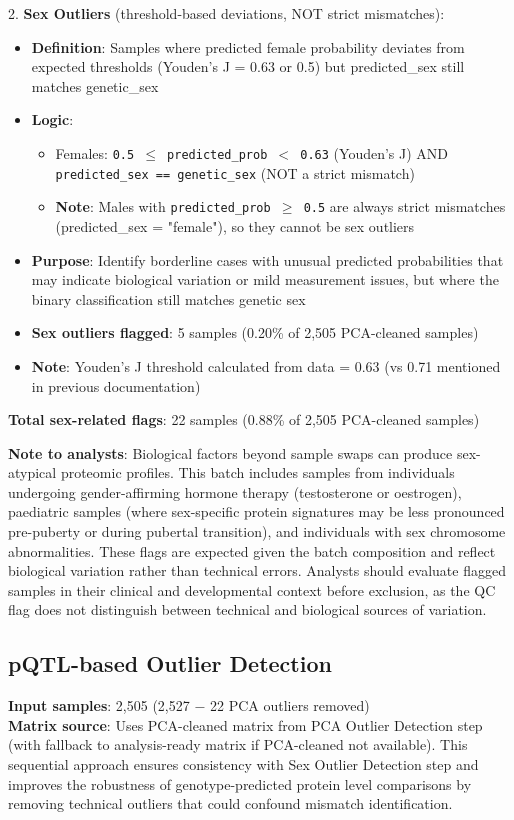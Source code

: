 \documentclass[11pt,a4paper]{article}
\begin{document}
2. \textbf{Sex Outliers} (threshold-based deviations, NOT strict mismatches):
   \begin{itemize}
     \item \textbf{Definition}: Samples where predicted female probability deviates from expected thresholds (Youden's J = 0.63 or 0.5) but predicted\_sex still matches genetic\_sex
     \item \textbf{Logic}:
       \begin{itemize}
         \item Females: \texttt{0.5 $\leq$ predicted\_prob $<$ 0.63} (Youden's J) AND \texttt{predicted\_sex == genetic\_sex} (NOT a strict mismatch)
         \item \textbf{Note}: Males with \texttt{predicted\_prob $\geq$ 0.5} are always strict mismatches (predicted\_sex = "female"), so they cannot be sex outliers
       \end{itemize}
     \item \textbf{Purpose}: Identify borderline cases with unusual predicted probabilities that may indicate biological variation or mild measurement issues, but where the binary classification still matches genetic sex
     \item \textbf{Sex outliers flagged}: 5 samples (0.20\% of 2,505 PCA-cleaned samples)
     \item \textbf{Note}: Youden's J threshold calculated from data = 0.63 (vs 0.71 mentioned in previous documentation)
   \end{itemize}

\textbf{Total sex-related flags}: 22 samples (0.88\% of 2,505 PCA-cleaned samples)

\textbf{Note to analysts}: Biological factors beyond sample swaps can produce sex-atypical proteomic profiles. This batch includes samples from individuals undergoing gender-affirming hormone therapy (testosterone or oestrogen), paediatric samples (where sex-specific protein signatures may be less pronounced pre-puberty or during pubertal transition), and individuals with sex chromosome abnormalities. These flags are expected given the batch composition and reflect biological variation rather than technical errors. Analysts should evaluate flagged samples in their clinical and developmental context before exclusion, as the QC flag does not distinguish between technical and biological sources of variation.

\subsection{pQTL-based Outlier Detection}
\textbf{Input samples}: 2,505 (2,527 $-$ 22 PCA outliers removed)\\
\textbf{Matrix source}: Uses PCA-cleaned matrix from PCA Outlier Detection step (with fallback to analysis-ready matrix if PCA-cleaned not available). This sequential approach ensures consistency with Sex Outlier Detection step and improves the robustness of genotype-predicted protein level comparisons by removing technical outliers that could confound mismatch identification.\\
\end{document}
